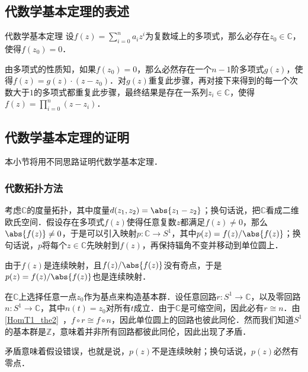 
\begin{issues}
\issueTODO
\end{issues}


\subsection{代数学基本定理的表述}

\begin{definition}{代数学基本定理}
设$f(z)=\sum\limits_{i=0}^n a_iz^i$为复数域上的多项式，那么必存在$z_0\in\mathbb{C}$，使得$f(z_0)=0$．
\end{definition}

由多项式的性质知，如果$f(z_0)=0$，那么必然存在一个$n-1$阶多项式$g(z)$，使得$f(z)=g(z)\cdot(z-z_0)$．对$g(z)$重复此步骤，再对接下来得到的每一个次数大于$1$的多项式都重复此步骤，最终结果是存在一系列$z_i\in\mathbb{C}$，使得$f(z)=\prod\limits_{i=0}^{n}(z-z_i)$．

\subsection{代数学基本定理的证明}

本小节将用不同思路证明代数学基本定理．

\subsubsection{代数拓扑方法}

考虑$\mathbb{C}$的度量拓扑，其中度量$d(z_1, z_2)=\abs{z_1-z_2}$；换句话说，把$\mathbb{C}$看成二维欧氏空间．假设存在多项式$f(z)$使得任意复数$z$都满足$f(z)\not=0$，那么$\abs{f(z)}\not=0$，于是可以引入映射$p:\mathbb{C}\rightarrow S^1$，其中$p(z)=f(z)/\abs{f(z)}$；换句话说，$p$将每个$z\in\mathbb{C}$先映射到$f(z)$，再保持辐角不变并移动到单位圆上．

由于$f(z)$是连续映射，且$f(z)/\abs{f(z)}$没有奇点，于是$p(z)=f(z)/\abs{f(z)}$也是连续映射．

在$\mathbb{C}$上选择任意一点$z_0$作为基点来构造基本群．设任意回路$r:S^1\rightarrow\mathbb{C}$，以及零回路$n:S^1\rightarrow\mathbb{C}$，其中$n(t)=z_0$对所有$t$成立．由于$\mathbb{C}$是可缩空间，因此必有$r\cong n$．由\autoref{HomT1_the2}~，$f\circ r\cong f\circ n$，因此单位圆上的回路也彼此同伦．然而我们知道$S^1$的基本群是$\mathbb{Z}$，意味着并非所有回路都彼此同伦，因此出现了矛盾．

矛盾意味着假设错误，也就是说，$p(z)$不是连续映射；换句话说，$p(z)$必然有零点．


